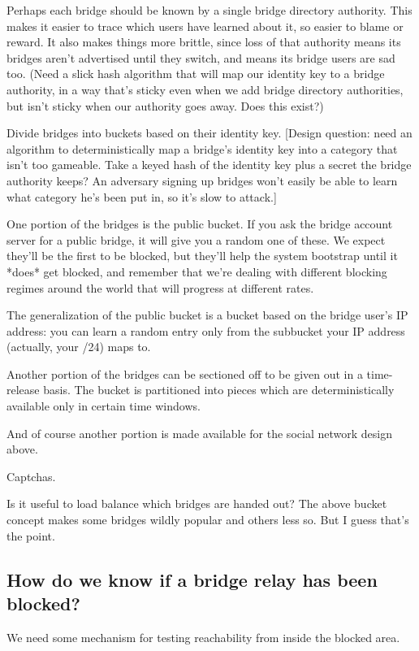 \documentclass{llncs}
\begin{document}
Perhaps each bridge should be known by a single bridge directory
authority. This makes it easier to trace which users have learned about
it, so easier to blame or reward. It also makes things more brittle,
since loss of that authority means its bridges aren't advertised until
they switch, and means its bridge users are sad too.
(Need a slick hash algorithm that will map our identity key to a
bridge authority, in a way that's sticky even when we add bridge
directory authorities, but isn't sticky when our authority goes
away. Does this exist?)

Divide bridges into buckets based on their identity key.
[Design question: need an algorithm to deterministically map a bridge's
identity key into a category that isn't too gameable. Take a keyed
hash of the identity key plus a secret the bridge authority keeps?
An adversary signing up bridges won't easily be able to learn what
category he's been put in, so it's slow to attack.]

One portion of the bridges is the public bucket. If you ask the
bridge account server for a public bridge, it will give you a random
one of these. We expect they'll be the first to be blocked, but they'll
help the system bootstrap until it *does* get blocked, and remember that
we're dealing with different blocking regimes around the world that will
progress at different rates.

The generalization of the public bucket is a bucket based on the bridge
user's IP address: you can learn a random entry only from the subbucket
your IP address (actually, your /24) maps to.

Another portion of the bridges can be sectioned off to be given out in
a time-release basis. The bucket is partitioned into pieces which are
deterministically available only in certain time windows.

And of course another portion is made available for the social network
design above.

Captchas.

Is it useful to load balance which bridges are handed out? The above
bucket concept makes some bridges wildly popular and others less so.
But I guess that's the point.

\subsection{How do we know if a bridge relay has been blocked?}

We need some mechanism for testing reachability from inside the
blocked area.
\end{document}
